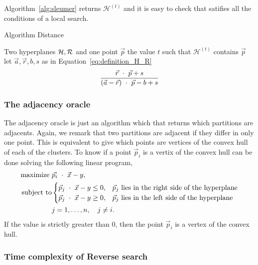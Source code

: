 \documentclass{article}
\newcommand{\cH}{\mathcal{H}}
\begin{document}
Algorithm~\ref{alg:sleumer} returns $\cH^{(t)}$ and  it is easy to check
that satifies all the conditions of a local search.
\begin{algorithm}
  \caption{Algorithm Distance}
  \begin{algorithmic}
  \REQUIRE Two hyperplanes $\cH, \cR$ and one point $\vec{p}$
  \ENSURE the value $t$ such that $\cH^{(t)}$ contains $\vec{p}$
  \STATE let $\vec{a}, \vec{r}, b, s$ as in
  Equation~\eqref{eq:definition_H_R} 
  \RETURN
  \begin{equation*}
    \frac{\vec{r}\ \cdot \ \vec{p}+s}
    {(\vec{a}-\vec{r})\ \cdot \ \vec{p}-b +s }
  \end{equation*}
  \end{algorithmic}
\end{algorithm} 

\subsubsection{The adjacency oracle}

The adjacency oracle is just an algorithm which that returns which
partitions are adjacents. Again, we remark that  two partitions are
adjacent if they differ 
in only one point. This is equivalent to give which points are
vertices of the convex hull of each of the clusters. 
To know if a point $\vec{p}_i$ is a vertix of the convex hull can be done 
solving the following linear program,
\begin{eqnarray*}
  \text{maximize }&\vec{p_i}\ \cdot \ \vec{x}-y,\\
  \text{subject to}&
  \begin{cases}
    \vec{p}_j\ \cdot \ \vec{x} - y\le 0,& \vec{p}_j\text{ lies in
      the right side of the hyperplane}\\
    \vec{p}_j\ \cdot \ \vec{x} - y\ge 0,& \vec{p}_j\text{ lies in
      the left side of the hyperplane}\\
  \end{cases}\\
  &j = 1,\ldots,n,\quad j\neq i.
\end{eqnarray*}
If the value is strictly greater than $0$, then the point $\vec{p}_i$ is a
vertex of the convex hull.

\subsubsection{Time complexity of Reverse search}
\end{document}
